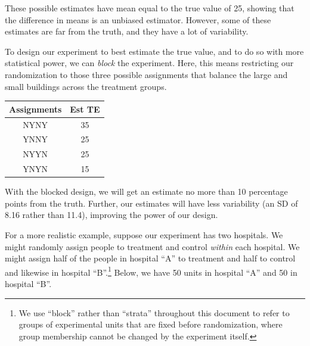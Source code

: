 \documentclass[
  12pt,
]{book}
\newenvironment{Shaded}{\begin{snugshade}}{\end{snugshade}}
\newcommand{\AttributeTok}[1]{\textcolor[rgb]{0.77,0.63,0.00}{#1}}
\newcommand{\DecValTok}[1]{\textcolor[rgb]{0.00,0.00,0.81}{#1}}
\newcommand{\FunctionTok}[1]{\textcolor[rgb]{0.00,0.00,0.00}{#1}}
\newcommand{\NormalTok}[1]{#1}
\newcommand{\OtherTok}[1]{\textcolor[rgb]{0.56,0.35,0.01}{#1}}
\newcommand{\SpecialCharTok}[1]{\textcolor[rgb]{0.00,0.00,0.00}{#1}}
\newcommand{\StringTok}[1]{\textcolor[rgb]{0.31,0.60,0.02}{#1}}
\theoremstyle{definition}
\theoremstyle{definition}
\theoremstyle{definition}
\theoremstyle{remark}
\begin{document}
These possible estimates have mean equal to the true value of 25,
showing that the difference in means is an unbiased estimator. However,
some of these estimates are far from the truth, and they have a lot of
variability.

To design our experiment to best estimate the true value, and to do so
with more statistical power, we can \emph{block} the experiment. Here,
this means restricting our randomization to those three possible
assignments that balance the large and small buildings across the
treatment groups.

\begin{center}
\begin{tabular}{cc}
Assignments & Est TE \\ \hline
NYNY & 35 \\
YNNY & 25 \\
NYYN & 25 \\
YNYN & 15 \\
\end{tabular}
\end{center}

With the blocked design, we will get an estimate no more than 10
percentage points from the truth. Further, our estimates will have less
variability (an SD of 8.16 rather than 11.4), improving the power of our
design.

For a more realistic example, suppose our experiment has two hospitals.
We might randomly assign people to treatment and control \emph{within}
each hospital. We might assign half of the people in hospital ``A'' to
treatment and half to control and likewise in hospital ``B''.\footnote{We
  use ``block'' rather than ``strata'' throughout this document to refer
  to groups of experimental units that are fixed before randomization,
  where group membership cannot be changed by the experiment itself.}
Below, we have 50 units in hospital ``A'' and 50 in hospital ``B''.

\begin{Shaded}
\end{Shaded}
\end{document}
